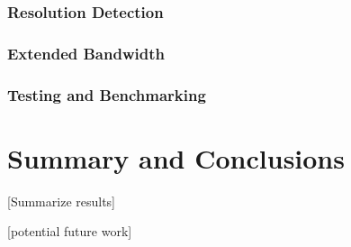 \documentclass[a4paper,12pt,twoside,openright]{report}
\begin{document}
\subsection{Resolution Detection}

\subsection{Extended Bandwidth}

\subsection{Testing and Benchmarking}

\chapter{Summary and Conclusions} 

[Summarize results]

[potential future work]

\appendix
\singlespacing

 
 
\end{document}
